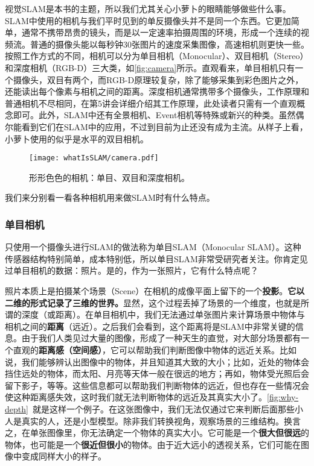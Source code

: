 视觉SLAM是本书的主题，所以我们尤其关心小萝卜的眼睛能够做些什么事。SLAM中使用的相机与我们平时见到的单反摄像头并不是同一个东西。它更加简单，通常不携带昂贵的镜头，而是以一定速率拍摄周围的环境，形成一个连续的视频流。普通的摄像头能以每秒钟30张图片的速度采集图像，高速相机则更快一些。按照工作方式的不同，相机可以分为单目相机（Monocular）、双目相机（Stereo）和深度相机（RGB-D）三大类，如\autoref{fig:camera}所示。直观看来，单目相机只有一个摄像头，双目有两个，而RGB-D原理较复杂，除了能够采集到彩色图片之外，还能读出每个像素与相机之间的距离。深度相机通常携带多个摄像头，工作原理和普通相机不尽相同，在第5讲会详细介绍其工作原理，此处读者只需有一个直观概念即可。此外，SLAM中还有全景相机\textsuperscript{\cite{Pretto2011}}、Event相机\textsuperscript{\cite{Rueckauer2016}}等特殊或新兴的种类。虽然偶尔能看到它们在SLAM中的应用，不过到目前为止还没有成为主流。从样子上看，小萝卜使用的似乎是水平的双目相机。

\begin{figure}[!ht]
	\centering
	\texttt{[image: whatIsSLAM/camera.pdf]}
	\caption{形形色色的相机：单目、双目和深度相机。}
	\label{fig:camera}
\end{figure}

我们来分别看一看各种相机用来做SLAM时有什么特点。

\subsubsection{单目相机}
只使用一个摄像头进行SLAM的做法称为单目SLAM（Monocular SLAM）。这种传感器结构特别简单，成本特别低，所以单目SLAM非常受研究者关注。你肯定见过单目相机的数据：照片。是的，作为一张照片，它有什么特点呢？

照片本质上是拍摄某个场景（Scene）在相机的成像平面上留下的一个\textbf{投影}。\textbf{它以二维的形式记录了三维的世界。}显然，这个过程丢掉了场景的一个维度，也就是所谓的深度（或距离）。在单目相机中，我们无法通过单张图片来计算场景中物体与相机之间的\textbf{距离}（远近）。之后我们会看到，这个距离将是SLAM中非常关键的信息。由于我们人类见过大量的图像，形成了一种天生的直觉，对大部分场景都有一个直观的\textbf{距离感（空间感）}，它可以帮助我们判断图像中物体的远近关系。比如说，我们能够辨认出图像中的物体，并且知道其大致的大小；比如，近处的物体会挡住远处的物体，而太阳、月亮等天体一般在很远的地方；再如，物体受光照后会留下影子，等等。这些信息都可以帮助我们判断物体的远近，但也存在一些情况会使这种距离感失效，这时我们就无法判断物体的远近及其真实大小了。\autoref{fig:why-depth}~就是这样一个例子。在这张图像中，我们无法仅通过它来判断后面那些小人是真实的人，还是小型模型。除非我们转换视角，观察场景的三维结构。换言之，在单张图像里，你无法确定一个物体的真实大小。它可能是一个\textbf{很大但很远}的物体，也可能是一个\textbf{很近但很小}的物体。由于近大远小的透视关系，它们可能在图像中变成同样大小的样子。

